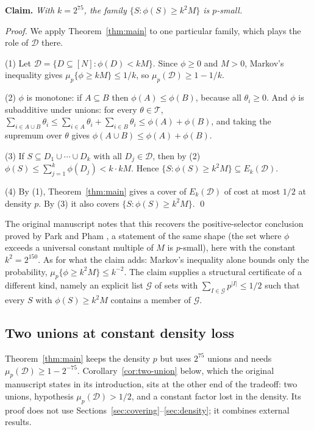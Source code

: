 \documentclass[11pt,letterpaper]{article}
\theoremstyle{definition}
\theoremstyle{remark}
\numberwithin{equation}{section}
\begin{document}
\smallskip
\noindent\textbf{Claim.} \emph{With $k=2^{75}$, the family
$\{S:\phi(S)\ge k^2M\}$ is $p$-small.}

\smallskip
\noindent\emph{Proof.} We apply Theorem~\ref{thm:main} to one particular
family, which plays the role of $\mathcal D$ there.

(1) Let $\mathcal D=\{D\subseteq[N]:\phi(D)<kM\}$. Since $\phi\ge0$ and
$M>0$, Markov's inequality gives $\mu_p\{\phi\ge kM\}\le1/k$, so
$\mu_p(\mathcal D)\ge1-1/k$.

(2) $\phi$ is monotone: if $A\subseteq B$ then $\phi(A)\le\phi(B)$,
because all $\theta_i\ge0$. And $\phi$ is subadditive under unions: for
every $\theta\in\mathcal T$,
$\sum_{i\in A\cup B}\theta_i\le\sum_{i\in A}\theta_i+\sum_{i\in B}\theta_i
\le\phi(A)+\phi(B)$, and taking the supremum over $\theta$ gives
$\phi(A\cup B)\le\phi(A)+\phi(B)$.

(3) If $S\subseteq D_1\cup\cdots\cup D_k$ with all $D_j\in\mathcal D$,
then by (2) $\phi(S)\le\sum_{j=1}^k\phi(D_j)<k\cdot kM$. Hence
$\{S:\phi(S)\ge k^2M\}\subseteq E_k(\mathcal D)$.

(4) By (1), Theorem~\ref{thm:main} gives a cover of $E_k(\mathcal D)$ of
cost at most $1/2$ at density $p$. By (3) it also covers
$\{S:\phi(S)\ge k^2M\}$. \qed

\smallskip
The original manuscript notes that this recovers the positive-selector
conclusion proved by Park and Pham \cite[Theorem~1.2]{ParkPham24}, a
statement of the same shape (the set where $\phi$ exceeds a universal
constant multiple of $M$ is $p$-small), here with the constant
$k^2=2^{150}$. As for what the claim adds: Markov's inequality alone
bounds only the probability, $\mu_p\{\phi\ge k^2M\}\le k^{-2}$. The claim
supplies a structural certificate of a different kind, namely an explicit
list $\mathcal G$ of sets with $\sum_{I\in\mathcal G}p^{|I|}\le1/2$ such
that every $S$ with $\phi(S)\ge k^2M$ contains a member of $\mathcal G$.

\subsection{Two unions at constant density loss}
\label{sec:two-union}

Theorem~\ref{thm:main} keeps the density $p$ but uses $2^{75}$ unions and
needs $\mu_p(\mathcal D)\ge1-2^{-75}$.
Corollary~\ref{cor:two-union} below, which the original manuscript states
in its introduction, sits at the other end of the tradeoff: two unions,
hypothesis $\mu_p(\mathcal D)>1/2$, and a constant factor lost in the
density. Its proof does not use
Sections~\ref{sec:covering}--\ref{sec:density}; it combines external
results.
\end{document}
